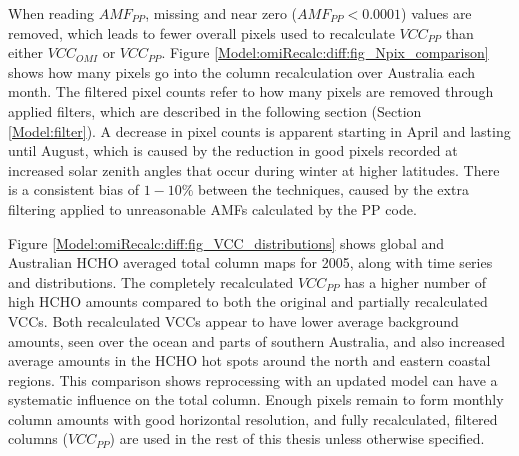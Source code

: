     
    
    When reading $AMF_{PP}$, missing and near zero ($AMF_{PP}<0.0001$) values are removed, which leads to fewer overall pixels used to recalculate $VCC_{PP}$ than either $VCC_{OMI}$ or $VCC_{PP}$. 
    Figure \ref{Model:omiRecalc:diff:fig_Npix_comparison} shows how many pixels go into the column recalculation over Australia each month.
    The filtered pixel counts refer to how many pixels are removed through applied filters, which are described in the following section (Section \ref{Model:filter}).
    A decrease in pixel counts is apparent starting in April and lasting until August, which is caused by the reduction in good pixels recorded at increased solar zenith angles that occur during winter at higher latitudes.
    There is a consistent bias of $1-10\%$ between the techniques, caused by the extra filtering applied to unreasonable AMFs calculated by the PP code.
    
    
    
    Figure \ref{Model:omiRecalc:diff:fig_VCC_distributions} shows global and Australian HCHO averaged total column maps for 2005, along with time series and distributions.
    The completely recalculated $VCC_{PP}$ has a higher number of high HCHO amounts compared to both the original and partially recalculated VCCs.
    Both recalculated VCCs appear to have lower average background amounts, seen over the ocean and parts of southern Australia, and also increased average amounts in the HCHO hot spots around the north and eastern coastal regions.
    This comparison shows reprocessing with an updated model can have a systematic influence on the total column.
    Enough pixels remain to form monthly column amounts with good horizontal resolution, and fully recalculated, filtered columns ($VCC_{PP}$) are used in the rest of this thesis unless otherwise specified.

